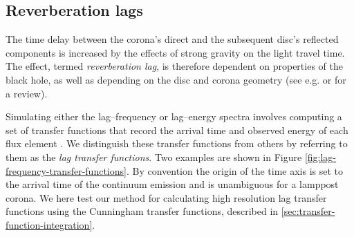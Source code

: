 \documentclass[fleqn,usenatbib]{mnras}
\begin{document}
\subsection{Reverberation lags}
\label{sec:lag-transfer-functions}

The time delay between the corona's direct and the subsequent disc's reflected
components is increased by the effects of strong gravity on the light travel
time. The effect, termed \emph{reverberation lag}, is therefore dependent on
properties of the black hole, as well as depending on the disc and corona
geometry (see e.g.  \cite{uttley_x-ray_2014} or
\cite{cackett_reverberation_2021} for a review).

Simulating either the lag--frequency or lag--energy spectra involves computing a
set of transfer functions that record the arrival time and observed energy of
each flux element \citep{reynolds_x-ray_1999}. We distinguish these transfer
functions from others by referring to them as the \textit{lag transfer
functions}. Two examples are shown in Figure
\ref{fig:lag-frequency-transfer-functions}. By convention the origin of the time
axis is set to the arrival time of the continuum emission and is unambiguous for
a lamppost corona. We here test our method for calculating high resolution lag
transfer functions using the Cunningham transfer functions, described in
\ref{sec:transfer-function-integration}.


\end{document}
